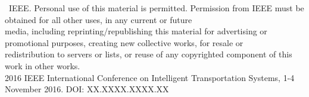 \documentclass{article}
\newcommand{\myPapersYear}{2016}
\newcommand{\myPapersDOI}{DOI: XX.XXXX.XXXX.XX} %
\newcommand{\fullCiteText}{2016 IEEE International Conference on Intelligent Transportation Systems, 1-4 November 2016}
\begin{document}
\footnotesize
\noindent\textcopyright \myPapersYear~IEEE. Personal use of this material is permitted. Permission from IEEE must be obtained for all other uses, in any current or future\\
media, including reprinting/republishing this material for advertising or promotional purposes, creating new collective works, for resale or\\
redistribution to servers or lists, or reuse of any copyrighted component of this work in other works.\\
\fullCiteText. \myPapersDOI

\newpage
\mbox{}
\newpage
\end{document}
